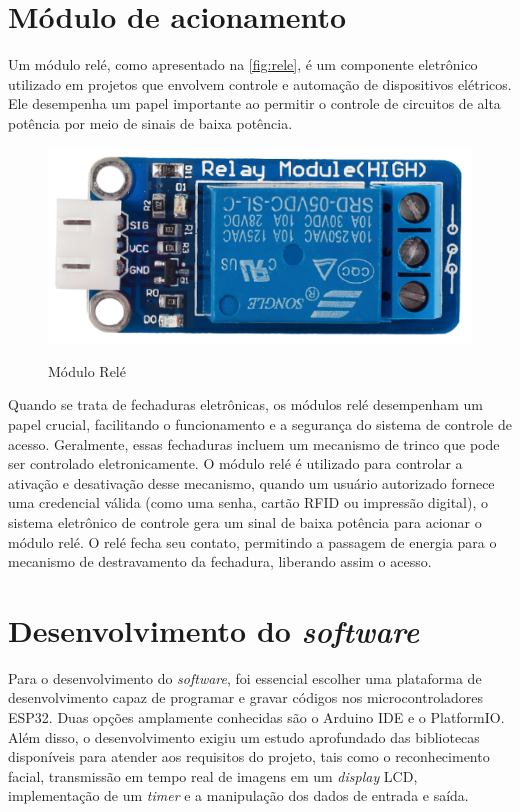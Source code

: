 \section{Módulo de acionamento}\label{sec:acionamento}

Um módulo relé, como apresentado na \autoref{fig:rele}, é um componente 
eletrônico utilizado em projetos que envolvem controle 
e automação de dispositivos elétricos. Ele desempenha 
um papel importante ao permitir o controle de circuitos 
de alta potência por meio de sinais de baixa potência.

\begin{figure}[h!]
    \centering
    \caption{Módulo Relé}
    \includegraphics[scale=0.8]{figuras/rele.png}
    \label{fig:rele}
    \centering
\end{figure}

Quando se trata de fechaduras eletrônicas, os módulos relé desempenham um 
papel crucial, facilitando o funcionamento e a segurança do sistema de 
controle de acesso. Geralmente, essas fechaduras 
incluem um mecanismo de trinco que pode ser controlado eletronicamente. 
O módulo relé é utilizado para controlar a ativação e desativação 
desse mecanismo, quando um usuário autorizado fornece uma credencial 
válida (como uma senha, cartão RFID ou impressão digital), o sistema 
eletrônico de controle gera um sinal de baixa potência para acionar 
o módulo relé. O relé fecha seu contato, permitindo a passagem de 
energia para o mecanismo de destravamento da fechadura, liberando 
assim o acesso.

\section{Desenvolvimento do \textit{software}}\label{sec:software}

Para o desenvolvimento do \textit{software}, foi essencial escolher uma plataforma 
de desenvolvimento capaz de programar e gravar códigos nos microcontroladores 
ESP32. Duas opções amplamente conhecidas são o Arduino IDE e o PlatformIO. 
Além disso, o desenvolvimento exigiu um estudo aprofundado das 
bibliotecas disponíveis para atender aos requisitos do projeto, 
tais como o reconhecimento facial, transmissão em tempo real de 
imagens em um \textit{display} LCD, implementação de um \textit{timer} e a manipulação 
dos dados de entrada e saída.

